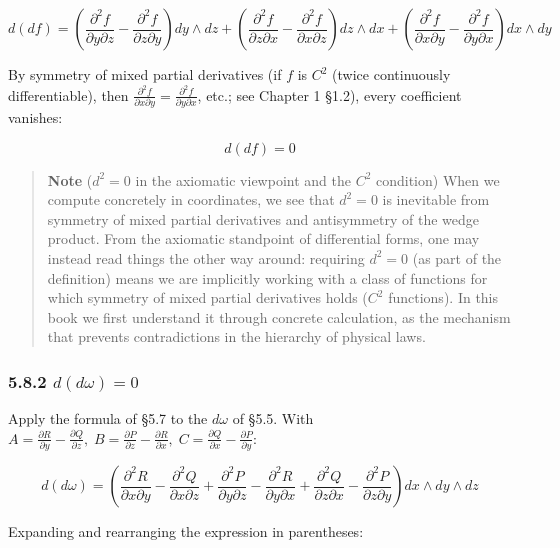 \[d(df) = \left(\frac{\partial^2 f}{\partial y \partial z} - \frac{\partial^2 f}{\partial z \partial y}\right) dy \wedge dz + \left(\frac{\partial^2 f}{\partial z \partial x} - \frac{\partial^2 f}{\partial x \partial z}\right) dz \wedge dx + \left(\frac{\partial^2 f}{\partial x \partial y} - \frac{\partial^2 f}{\partial y \partial x}\right) dx \wedge dy\]

By symmetry of mixed partial derivatives (if \(f\) is \(C^2\) (twice
continuously differentiable), then
\(\frac{\partial^2 f}{\partial x \partial y} = \frac{\partial^2 f}{\partial y \partial x}\),
etc.; see Chapter 1 §1.2), every coefficient vanishes:

\[d(df) = 0\]

\begin{quote}
\textbf{Note} (\(d^2=0\) in the axiomatic viewpoint and the \(C^2\)
condition) When we compute concretely in coordinates, we see that
\(d^2=0\) is inevitable from symmetry of mixed partial derivatives and
antisymmetry of the wedge product. From the axiomatic standpoint of
differential forms, one may instead read things the other way around:
requiring \(d^2=0\) (as part of the definition) means we are implicitly
working with a class of functions for which symmetry of mixed partial
derivatives holds (\(C^2\) functions). In this book we first understand
it through concrete calculation, as the mechanism that prevents
contradictions in the hierarchy of physical laws.
\end{quote}

\hypertarget{ddomega-0}{%
\subsubsection{\texorpdfstring{5.8.2
\(d(d\omega) = 0\)}{5.8.2 d(d\textbackslash omega) = 0}}\label{ddomega-0}}

Apply the formula of §5.7 to the \(d\omega\) of §5.5. With
\(A = \frac{\partial R}{\partial y} - \frac{\partial Q}{\partial z},\; B = \frac{\partial P}{\partial z} - \frac{\partial R}{\partial x},\; C = \frac{\partial Q}{\partial x} - \frac{\partial P}{\partial y}\):

\[d(d\omega) = \left(\frac{\partial^2 R}{\partial x \partial y} - \frac{\partial^2 Q}{\partial x \partial z} + \frac{\partial^2 P}{\partial y \partial z} - \frac{\partial^2 R}{\partial y \partial x} + \frac{\partial^2 Q}{\partial z \partial x} - \frac{\partial^2 P}{\partial z \partial y}\right) dx \wedge dy \wedge dz\]

Expanding and rearranging the expression in parentheses:


